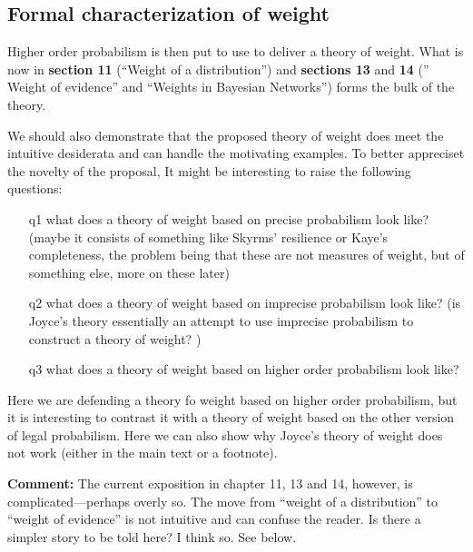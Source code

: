 \documentclass[
  10pt,
  dvipsnames,enabledeprecatedfontcommands]{scrartcl}
\begin{document}
\hypertarget{formal-characterization-of-weight}{%
\subsection{Formal characterization of
weight}\label{formal-characterization-of-weight}}

Higher order probabilism is then put to use to deliver a theory of
weight. What is now in \textbf{section 11} (``Weight of a
distribution'') and \textbf{sections 13} and \textbf{14} ('' Weight of
evidence'' and ``Weights in Bayesian Networks'') forms the bulk of the
theory.

We should also demonstrate that the proposed theory of weight does meet
the intuitive desiderata and can handle the motivating examples. To
better appreciset the novelty of the proposal, It might be interesting
to raise the following questions:

\begin{itemize}

\item[q1] what does a theory of weight based on precise probabilism look like? (maybe it consists of something like Skyrms' resilience or Kaye's completeness, the problem being that these are not measures of weight, but of something else, more on these later)

\item[q2] what does a theory of weight based on imprecise probabilism look like? (is Joyce's theory essentially an attempt to use imprecise probabilism to construct a theory of weight? )

\item[q3] what does a theory of weight based on higher order probabilism look like?

\end{itemize}

Here we are defending a theory fo weight based on higher order
probabilism, but it is interesting to contrast it with a theory of
weight based on the other version of legal probabilism. Here we can also
show why Joyce's theory of weight does not work (either in the main text
or a footnote).

\textbf{Comment:} The current exposition in chapter 11, 13 and 14,
however, is complicated---perhaps overly so. The move from ``weight of a
distribution'' to ``weight of evidence'' is not intuitive and can
confuse the reader. Is there a simpler story to be told here? I think
so. See below.
\end{document}
